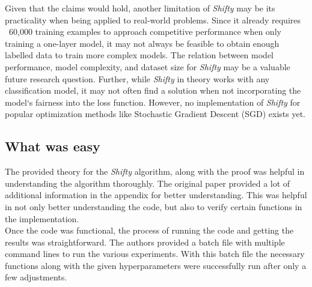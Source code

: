
Given that the claims would hold, another limitation of \textit{Shifty} may be its practicality when being applied to real-world problems. Since it already requires ~60,000 training examples to approach competitive performance when only training a one-layer model, it may not always be feasible to obtain enough labelled data to train more complex models. The relation between model performance, model complexity, and dataset size for \textit{Shifty} may be a valuable future research question. Further, while \textit{Shifty} in theory works with any classification model, it may not often find a solution when not incorporating the model`s fairness into the loss function. However, no implementation of \textit{Shifty} for popular optimization methods like Stochastic Gradient Descent (SGD) exists yet.

\subsection{What was easy}

The provided theory for the \textit{Shifty} algorithm, along with the proof was helpful in understanding the algorithm thoroughly. The original paper provided a lot of additional information in the appendix for better understanding. This was helpful in not only better understanding the code, but also to verify certain functions in the implementation.\\

Once the code was functional, the process of running the code and getting the results was straightforward. The authors  provided a batch file with multiple command lines to run the various experiments. With this batch file the necessary functions along with the given hyperparameters were successfully run after only a few adjustments.




